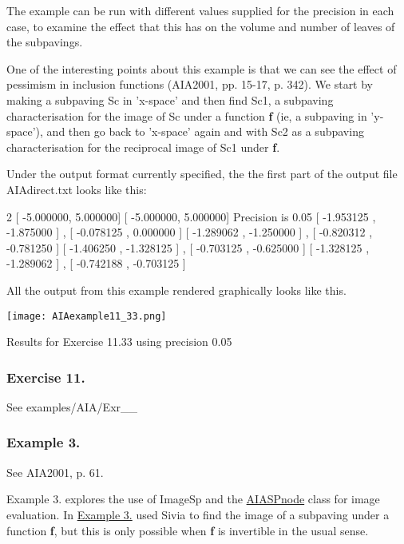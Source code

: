 \-The example can be run with different values supplied for the precision in each case, to examine the effect that this has on the volume and number of leaves of the subpavings.

\-One of the interesting points about this example is that we can see the effect of pessimism in inclusion functions (\-A\-I\-A2001, pp. 15-\/17, p. 342). \-We start by making a subpaving \-Sc in 'x-\/space' and then find \-Sc1, a subpaving characterisation for the image of \-Sc under a function {\bfseries f} (ie, a subpaving in 'y-\/space'), and then go back to 'x-\/space' again and with \-Sc2 as a subpaving characterisation for the reciprocal image of \-Sc1 under {\bfseries f}.

\-Under the output format currently specified, the the first part of the output file \-A\-I\-Adirect.\-txt looks like this\-:

\begin{DoxyVerb}
2
[ -5.000000,  5.000000] [ -5.000000,  5.000000]
Precision is 0.05
[  -1.953125 ,  -1.875000 ] , [  -0.078125 ,   0.000000 ]
[  -1.289062 ,  -1.250000 ] , [  -0.820312 ,  -0.781250 ]
[  -1.406250 ,  -1.328125 ] , [  -0.703125 ,  -0.625000 ]
[  -1.328125 ,  -1.289062 ] , [  -0.742188 ,  -0.703125 ]
\end{DoxyVerb}


\-All the output from this example rendered graphically looks like this.

 
\begin{DoxyImage}
\texttt{[image: AIAexample11\_33.png]}
\caption{\-Results for \-Exercise 11.33 using precision 0.05}
\end{DoxyImage}
\hypertarget{AIASubPavings_AIAexamsec_11_35}{}\subsubsection{\-Exercise 11.}\label{AIASubPavings_AIAexamsec_11_35}
\-See examples/\-A\-I\-A/\-Exr\-\_\-\_\hypertarget{AIASubPavings_AIAexamsec_3_3}{}\subsubsection{\-Example 3.}\label{AIASubPavings_AIAexamsec_3_3}
\-See \-A\-I\-A2001, p. 61.

\-Example 3. explores the use of \-Image\-Sp and the \hyperlink{classAIASPnode}{\-A\-I\-A\-S\-Pnode} class for image evaluation. \-In \hyperlink{AIASubPavings_AIAexamsec_3_3}{\-Example 3.} used \-Sivia to find the image of a subpaving under a function {\bfseries f}, but this is only possible when {\bfseries f} is invertible in the usual sense.

